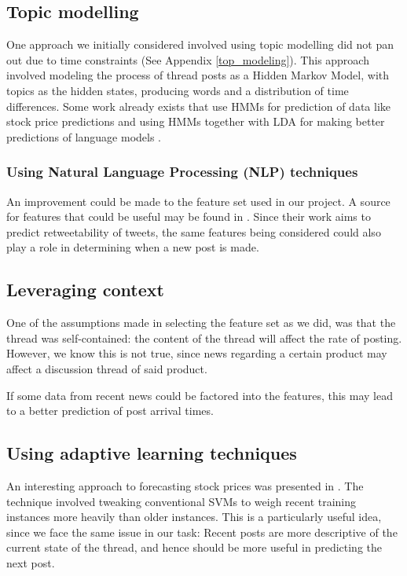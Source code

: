 \subsection{Topic modelling}
One approach we initially considered involved using topic modelling did not pan 
out due to time constraints (See Appendix \ref{top_modeling}). This approach 
involved modeling the process of thread posts as a Hidden Markov Model, with 
topics as the hidden states, producing words and a distribution of time 
differences. Some work already exists that use HMMs for prediction of data like 
stock price predictions \cite{Gonzalez2005} and using HMMs together with LDA for 
making better predictions of language models \cite{Hsu2006}.

\subsubsection{Using Natural Language Processing (NLP) techniques}
An improvement could be made to the feature set used in our project. A source 
for features that could be useful may be found in . Since their 
work aims to predict retweetability of tweets, the same features being 
considered could also play a role in determining when a new post is made.

\subsection{Leveraging context}
One of the assumptions made in selecting the feature set as we did, was that the 
thread was self-contained: the content of the thread will affect the rate of 
posting. However, we know this is not true, since news regarding a certain 
product may affect a discussion thread of said product.

If some data from recent news could be factored into the features, this may lead 
to a better prediction of post arrival times.

\subsection{Using adaptive learning techniques}
An interesting approach to forecasting stock prices was presented in 
. The technique involved tweaking conventional SVMs to weigh 
recent training instances more heavily than older instances. This is a 
particularly useful idea, since we face the same issue in our task: Recent posts 
are more descriptive of the current state of the thread, and hence should be 
more useful in predicting the next post.
